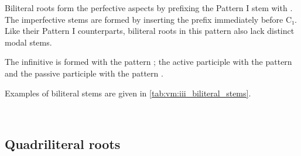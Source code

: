 \documentclass[grammar]{subfiles}
\begin{document}
Biliteral roots form the perfective aspects by prefixing the Pattern I stem
with .  The imperfective stems are formed by inserting the prefix
 immediately before C₁.  Like their Pattern I counterparts, biliteral
roots in this pattern also lack distinct modal stems. 

The infinitive is formed with the pattern ; the active participle
with the pattern  and the passive participle with the pattern
. 

Examples of biliteral stems are given in \cref{tab:vm:iii_biliteral_stems}. 

\begin{table}[h!]\small\capstart
  \centering
  \\
  \caption{Pattern III biliteral stems \label{tab:vm:iii_biliteral_stems}}
\end{table}
    

\subsection{Quadriliteral roots}
\label{ssec:vm:iii_quadriliteral_roots}
\end{document}
